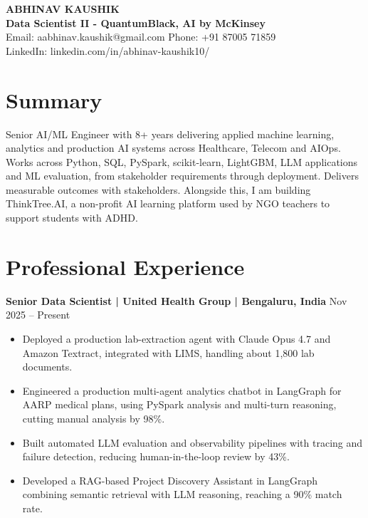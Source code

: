 \documentclass[10pt,a4paper]{article}
\newcommand{\role}[2]{\textbf{#1} \hfill #2\par}
\begin{document}
\begin{center}
  {\Large\bfseries ABHINAV KAUSHIK}\\[1pt]
  \textbf{Data Scientist II - QuantumBlack, AI by McKinsey}\\[1pt]
  Email: aabhinav.kaushik@gmail.com \quad Phone: +91 87005 71859\\
  LinkedIn: linkedin.com/in/abhinav-kaushik10/
\end{center}

\section{Summary}
Senior AI/ML Engineer with 8+ years delivering applied machine learning, analytics and production AI systems across Healthcare, Telecom and AIOps. Works across Python, SQL, PySpark, scikit-learn, LightGBM, LLM applications and ML evaluation, from stakeholder requirements through deployment. Delivers measurable outcomes with stakeholders. Alongside this, I am building ThinkTree.AI, a non-profit AI learning platform used by NGO teachers to support students with ADHD.

\section{Professional Experience}
\role{Senior Data Scientist | United Health Group | Bengaluru, India}{Nov 2025 -- Present}
\begin{itemize}
  \item Deployed a production lab-extraction agent with Claude Opus 4.7 and Amazon Textract, integrated with LIMS, handling about 1,800 lab documents.
  \item Engineered a production multi-agent analytics chatbot in LangGraph for AARP medical plans, using PySpark analysis and multi-turn reasoning, cutting manual analysis by 98\%.
  \item Built automated LLM evaluation and observability pipelines with tracing and failure detection, reducing human-in-the-loop review by 43\%.
  \item Developed a RAG-based Project Discovery Assistant in LangGraph combining semantic retrieval with LLM reasoning, reaching a 90\% match rate.
\end{itemize}
\vspace{3pt}
\end{document}
